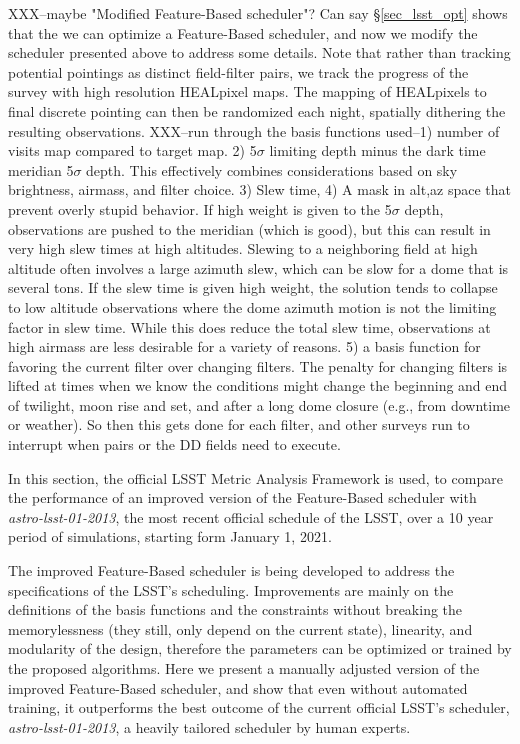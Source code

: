 \documentclass[12pt,aas_macros]{article}
\theoremstyle{definition}
\begin{document}
XXX--maybe "Modified Feature-Based scheduler"? Can say \S\ref{sec_lsst_opt} shows that the we can optimize a Feature-Based scheduler, and now we modify the scheduler presented above to address some details.  Note that rather than tracking potential pointings as distinct field-filter pairs, we track the progress of the survey with high resolution HEALpixel maps. The mapping of HEALpixels to final discrete pointing can then be randomized each night, spatially dithering the resulting observations. 
XXX--run through the basis functions used--1) number of visits map compared to target map. 2) 5$\sigma$ limiting depth minus the dark time meridian 5$\sigma$ depth. This effectively combines considerations based on sky brightness, airmass, and filter choice. 3) Slew time, 4) A mask in alt,az space that prevent overly stupid behavior. If high weight is given to the 5$\sigma$ depth, observations are pushed to the meridian (which is good), but this can result in very high slew times at high altitudes. Slewing to a neighboring field at high altitude often involves a large azimuth slew, which can be slow for a dome that is several tons.  If the slew time is given high weight, the solution tends to collapse to low altitude observations where the dome azimuth motion is not the limiting factor in slew time. While this does reduce the total slew time, observations at high airmass are less desirable for a variety of reasons. 5) a basis function for favoring the current filter over changing filters. The penalty for changing filters is lifted at times when we know the conditions might change the beginning and end of twilight, moon rise and set, and after a long dome closure (e.g., from downtime or weather). So then this gets done for each filter, and other surveys run to interrupt when pairs or the DD fields need to execute.

In this section, the official LSST Metric Analysis Framework \cite{jones2014lsst} is used, to compare the performance of an improved version of the Feature-Based scheduler with \textit{astro-lsst-01-2013}, the most recent official schedule of the LSST, over a 10 year period of simulations, starting form January 1, 2021.

The improved Feature-Based scheduler is being developed to address the specifications of the LSST's scheduling. Improvements are mainly on the definitions of the basis functions and the constraints without breaking the memorylessness (they still, only depend on the current state),  linearity, and modularity of the design, therefore the parameters can be optimized or trained by the proposed algorithms. Here we present a manually adjusted version of the improved Feature-Based scheduler, and show that even without automated training, it outperforms the best outcome of the current official LSST's scheduler, \textit{astro-lsst-01-2013}, a heavily tailored scheduler by human experts. 
\end{document}
